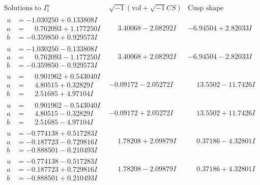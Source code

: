 \documentclass[1p]{elsarticle_modified}
\theoremstyle{definition}
\newcommand{\I}{\sqrt{-1}}
\begin{document}
$$\begin{array}{c|c|c}  
\text{Solutions to }I^u_{1}& \I (\text{vol} + \sqrt{-1}CS) & \text{Cusp shape}\\
 \hline 
\begin{aligned}
u &= -1.030250 + 0.133808 I \\
a &= \phantom{-}0.762093 + 1.177250 I \\
b &= -0.359850 + 0.929573 I\end{aligned}
 & \phantom{-}3.40068 - 2.08292 I & -6.94504 + 2.82033 I \\ \hline\begin{aligned}
u &= -1.030250 - 0.133808 I \\
a &= \phantom{-}0.762093 - 1.177250 I \\
b &= -0.359850 - 0.929573 I\end{aligned}
 & \phantom{-}3.40068 + 2.08292 I & -6.94504 - 2.82033 I \\ \hline\begin{aligned}
u &= \phantom{-}0.901962 + 0.543040 I \\
a &= \phantom{-}4.80515 + 0.32829 I \\
b &= \phantom{-}2.51685 + 4.97104 I\end{aligned}
 & -0.09172 - 2.05272 I & \phantom{-}13.5502 - 11.7426 I \\ \hline\begin{aligned}
u &= \phantom{-}0.901962 - 0.543040 I \\
a &= \phantom{-}4.80515 - 0.32829 I \\
b &= \phantom{-}2.51685 - 4.97104 I\end{aligned}
 & -0.09172 + 2.05272 I & \phantom{-}13.5502 + 11.7426 I \\ \hline\begin{aligned}
u &= -0.774138 + 0.517283 I \\
a &= -0.187723 - 0.729816 I \\
b &= -0.888501 - 0.210493 I\end{aligned}
 & \phantom{-}1.78208 + 2.09879 I & \phantom{-}0.37186 - 4.32801 I \\ \hline\begin{aligned}
u &= -0.774138 - 0.517283 I \\
a &= -0.187723 + 0.729816 I \\
b &= -0.888501 + 0.210493 I\end{aligned}
 & \phantom{-}1.78208 - 2.09879 I & \phantom{-}0.37186 + 4.32801 I \\ \hline\begin{aligned}

\end{aligned}
\end{array}$$
\end{document}
